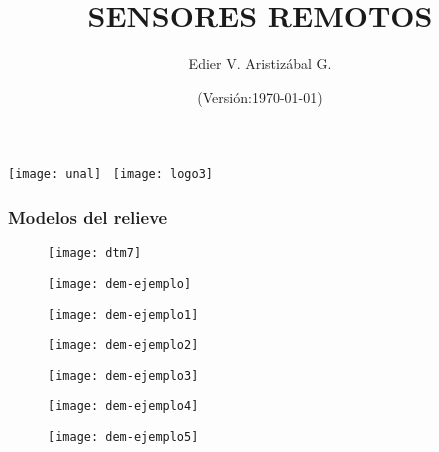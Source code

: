 \documentclass[14pt]{beamer}
\title[Cartografía Geológica]{SENSORES REMOTOS}
\author[Edier Aristizábal]{Edier V. Aristizábal G.}
\institute{\emph{evaristizabalg@unal.edu.co}}
\date{(Versión:\today)}
\begin{document}
\begin{frame}
\titlepage
\centering
	\texttt{[image: unal]}\hspace*{4.75cm}~%
   	\texttt{[image: logo3]} 
\end{frame}
  \begin{frame}
\frametitle{Modelos del relieve}
 \begin{figure}
    \centering
    \texttt{[image: dtm7]}
  \end{figure}
\end{frame}
  \begin{frame}
 \begin{figure}
    \centering
    \texttt{[image: dem-ejemplo]}
  \end{figure}
\end{frame}
  \begin{frame}
 \begin{figure}
    \centering
    \texttt{[image: dem-ejemplo1]}
  \end{figure}
\end{frame}
  \begin{frame}
 \begin{figure}
    \centering
    \texttt{[image: dem-ejemplo2]}
  \end{figure}
\end{frame}
  \begin{frame}
 \begin{figure}
    \centering
    \texttt{[image: dem-ejemplo3]}
  \end{figure}
\end{frame}
  \begin{frame}
 \begin{figure}
    \centering
    \texttt{[image: dem-ejemplo4]}
  \end{figure}
\end{frame}
  \begin{frame}
 \begin{figure}
    \centering
    \texttt{[image: dem-ejemplo5]}
  \end{figure}
\end{frame}
\end{document}
